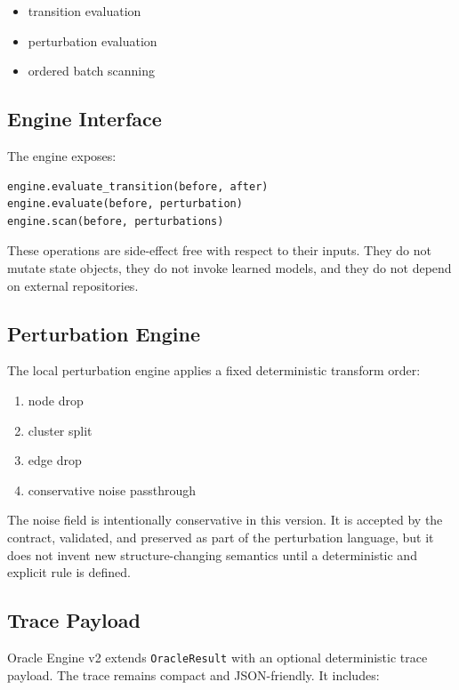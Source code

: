 \documentclass[11pt]{article}
\begin{document}
\begin{itemize}
\item transition evaluation
\item perturbation evaluation
\item ordered batch scanning
\end{itemize}

\subsection{Engine Interface}

The engine exposes:

\begin{verbatim}
engine.evaluate_transition(before, after)
engine.evaluate(before, perturbation)
engine.scan(before, perturbations)
\end{verbatim}

These operations are side-effect free with respect to their inputs.
They do not mutate state objects, they do not invoke learned models, and they do not depend on external repositories.

\subsection{Perturbation Engine}

The local perturbation engine applies a fixed deterministic transform order:

\begin{enumerate}
\item node drop
\item cluster split
\item edge drop
\item conservative noise passthrough
\end{enumerate}

The noise field is intentionally conservative in this version.
It is accepted by the contract, validated, and preserved as part of the perturbation language, but it does not invent new structure-changing semantics until a deterministic and explicit rule is defined.

\subsection{Trace Payload}

Oracle Engine v2 extends \texttt{OracleResult} with an optional deterministic trace payload.
The trace remains compact and JSON-friendly.
It includes:
\end{document}

